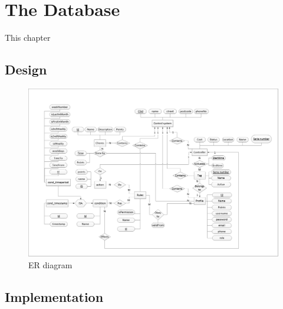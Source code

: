 \chapter{The Database}
This chapter 
\section{Design}


\begin{figure}
	\centering
		\includegraphics[width=1.00\textwidth]{images/ERdiagram.jpg}
	\caption{ER diagram}
	\label{fig:ERdiagram}
\end{figure}

\section{Implementation}

